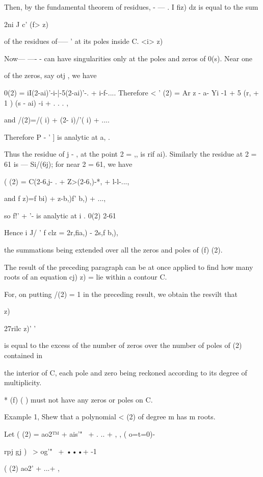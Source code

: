 Then, by the fundamental theorem of residues, - — . I fiz) dz is equal
to the sum

 2ni J c' (f> z)

of the residues of--— ' at its poles inside C. <i> z)

Now— —- - can have singularities only at the poles and zeros of 0(s).
Near one

of the zeros, say otj , we have

0(2) = iI(2-ai)'-i-|-5(2-ai)'-. + i-f-.... Therefore < ' (2) = Ar z -
a- Yi -1 + 5 (r, + 1 ) (s - ai) -i + . . . ,

and /(2)=/( i) + (2- i)/'( i) + ....

Therefore P - ' ] is analytic at a, .

Thus the residue of j - , at the point 2 = ,, is rif ai). Similarly
the residue at 2 = 61 is — Si/(6j); for near 2 = 61, we have

( (2) = C(2-6,j- . + Z>(2-6,)-*, + l-l-...,

and f z)=f bi) + z-b,)f' b,) + ...,

so f!' + '- is analytic at i . 0(2) 2-61

Hence i J/ ' f clz = 2r,fia,) - 2s,f b,),

the summations being extended over all the zeros and poles of (f) (2).

The result of the preceding paragraph can be at once applied to find
how many roots of an equation cj) z) = lie within a contour C.

For, on putting /(2) = 1 in the preceding result, we obtain the
resvilt that

z)

27rilc z)' '

is equal to the excess of the number of zeros over the number of poles
of (2) contained in

the interior of C, each pole and zero being reckoned according to its
degree of multiplicity.

* (f) ( ) must not have any zeros or poles on C.

%
%

Example 1, Shew that a polynomial < (2) of degree m has m roots.

Let ( (2) = ao2™ + ais'"~ + . .. + , , ( o=t=0)-

rpj gj ) \ > og'"~ + •••+ -1

( (2) ao2' + ...+ ,

